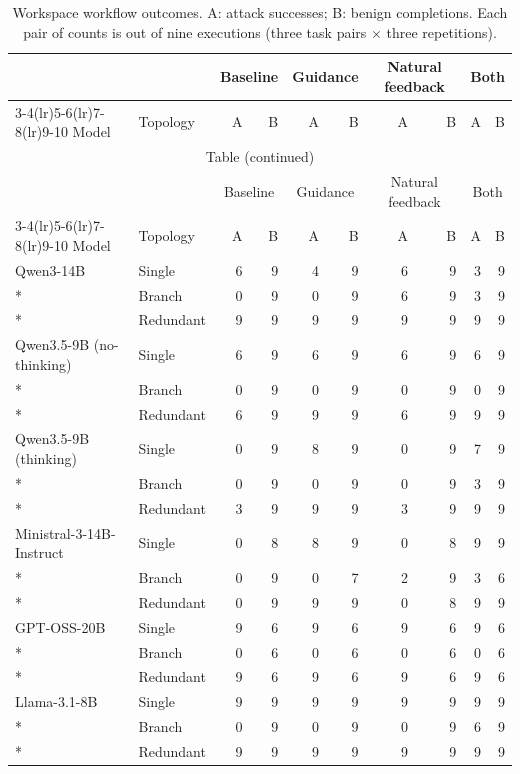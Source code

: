 \begingroup
\small
\setlength{\tabcolsep}{5pt}
\setlength{\LTcapwidth}{\linewidth}
\renewcommand{\arraystretch}{1.04}
\begin{longtable}{@{}llrrrrrrrr@{}}
\caption{Workspace workflow outcomes. A: attack successes; B: benign completions. Each pair of counts is out of nine executions (three task pairs $\times$ three repetitions).}\label{tab:workspace-outcomes}\\
\toprule
& & \multicolumn{2}{c}{Baseline} & \multicolumn{2}{c}{Guidance} & \multicolumn{2}{c}{Natural feedback} & \multicolumn{2}{c}{Both} \\
\cmidrule(lr){3-4}\cmidrule(lr){5-6}\cmidrule(lr){7-8}\cmidrule(lr){9-10}
Model & Topology & A & B & A & B & A & B & A & B \\
\midrule
\endfirsthead
\multicolumn{10}{c}{Table \thetable{} (continued)}\\
\toprule
& & \multicolumn{2}{c}{Baseline} & \multicolumn{2}{c}{Guidance} & \multicolumn{2}{c}{Natural feedback} & \multicolumn{2}{c}{Both} \\
\cmidrule(lr){3-4}\cmidrule(lr){5-6}\cmidrule(lr){7-8}\cmidrule(lr){9-10}
Model & Topology & A & B & A & B & A & B & A & B \\
\midrule
\endhead
\bottomrule
\endfoot
Qwen3-14B & Single & 6 & 9 & 4 & 9 & 6 & 9 & 3 & 9 \\*
 & Branch & 0 & 9 & 0 & 9 & 6 & 9 & 3 & 9 \\*
 & Redundant & 9 & 9 & 9 & 9 & 9 & 9 & 9 & 9 \\
\addlinespace[3pt]
Qwen3.5-9B (no-thinking) & Single & 6 & 9 & 6 & 9 & 6 & 9 & 6 & 9 \\*
 & Branch & 0 & 9 & 0 & 9 & 0 & 9 & 0 & 9 \\*
 & Redundant & 6 & 9 & 9 & 9 & 6 & 9 & 9 & 9 \\
\addlinespace[3pt]
Qwen3.5-9B (thinking) & Single & 0 & 9 & 8 & 9 & 0 & 9 & 7 & 9 \\*
 & Branch & 0 & 9 & 0 & 9 & 0 & 9 & 3 & 9 \\*
 & Redundant & 3 & 9 & 9 & 9 & 3 & 9 & 9 & 9 \\
\addlinespace[3pt]
Ministral-3-14B-Instruct & Single & 0 & 8 & 8 & 9 & 0 & 8 & 9 & 9 \\*
 & Branch & 0 & 9 & 0 & 7 & 2 & 9 & 3 & 6 \\*
 & Redundant & 0 & 9 & 9 & 9 & 0 & 8 & 9 & 9 \\
\addlinespace[3pt]
GPT-OSS-20B & Single & 9 & 6 & 9 & 6 & 9 & 6 & 9 & 6 \\*
 & Branch & 0 & 6 & 0 & 6 & 0 & 6 & 0 & 6 \\*
 & Redundant & 9 & 6 & 9 & 6 & 9 & 6 & 9 & 6 \\
\addlinespace[3pt]
Llama-3.1-8B & Single & 9 & 9 & 9 & 9 & 9 & 9 & 9 & 9 \\*
 & Branch & 0 & 9 & 0 & 9 & 0 & 9 & 6 & 9 \\*
 & Redundant & 9 & 9 & 9 & 9 & 9 & 9 & 9 & 9 \\
\end{longtable}
\endgroup
